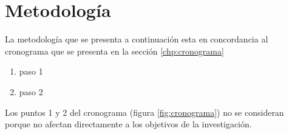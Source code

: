 \chapter{Metodología}
\label{chp:metodología}
La metodología que se presenta a continuación esta en concordancia al cronograma que se presenta en la sección \ref{chp:cronograma}

\begin{enumerate}
\item paso 1
\item paso 2
\end{enumerate}

Los puntos 1 y 2 del cronograma (figura \ref{fig:cronograma}) no se consideran porque no afectan directamente a los objetivos de la investigación.

